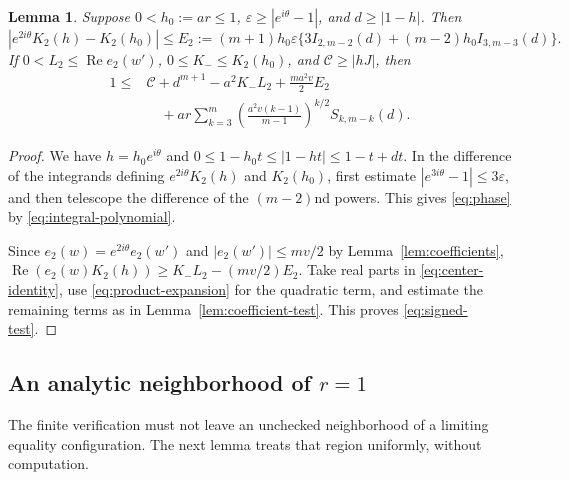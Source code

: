 \documentclass[11pt,reqno]{amsart}
\newtheorem{lem}[thm]{Lemma}
\theoremstyle{definition}
\theoremstyle{remark}
\numberwithin{equation}{section}
\newcommand{\Rea}{\operatorname{Re}}
\begin{document}
\begin{lem}\label{lem:phase}
Suppose $0<h_0:=ar\le1$, $\varepsilon\ge|e^{i\theta}-1|$, and $d\ge|1-h|$. Then
\begin{equation}\label{eq:phase}
 |e^{2i\theta}K_2(h)-K_2(h_0)|
 \le E_2:=(m+1)h_0\varepsilon
 \{3I_{2,m-2}(d)+(m-2)h_0I_{3,m-3}(d)\}.
\end{equation}
If $0<L_2\le\Rea e_2(w')$, $0\le K_-\le K_2(h_0)$, and $\mathcal C\ge|hJ|$, then
\begin{equation}\label{eq:signed-test}
 \begin{split}
 1\le{}&\mathcal C+d^{m+1}-a^2K_-L_2
       +\frac{ma^2v}{2}E_2\\
 &\quad+ar\sum_{k=3}^m
 \left(\frac{a^2v(k-1)}{m-1}\right)^{k/2}S_{k,m-k}(d).
 \end{split}
\end{equation}
\end{lem}
\begin{proof}
We have $h=h_0e^{i\theta}$ and $0\le1-h_0t\le|1-ht|\le1-t+dt$. In the difference of the integrands defining $e^{2i\theta}K_2(h)$ and $K_2(h_0)$, first estimate $|e^{3i\theta}-1|\le3\varepsilon$, and then telescope the difference of the $(m-2)$nd powers. This gives \eqref{eq:phase} by \eqref{eq:integral-polynomial}.

Since $e_2(w)=e^{2i\theta}e_2(w')$ and $|e_2(w')|\le mv/2$ by Lemma~\ref{lem:coefficients},
$\Rea(e_2(w)K_2(h))\ge K_-L_2-(mv/2)E_2$.
Take real parts in \eqref{eq:center-identity}, use \eqref{eq:product-expansion} for the quadratic term, and estimate the remaining terms as in Lemma~\ref{lem:coefficient-test}. This proves \eqref{eq:signed-test}.
\end{proof}

\subsection{An analytic neighborhood of \texorpdfstring{$r=1$}{r=1}}

The finite verification must not leave an unchecked neighborhood of a limiting equality configuration. The next lemma treats that region uniformly, without computation.
\end{document}
